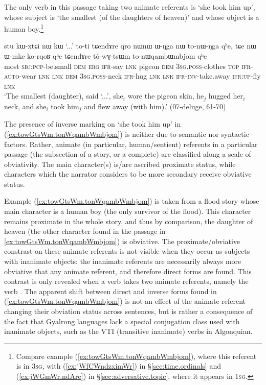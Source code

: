 The only verb in this passage taking two animate referents is  `she took him up', whose subject is  `the smallest (of the daughters of heaven)' and whose object is a human boy.\footnote{Compare example (\ref{ex:towGtsWm.tonWqambWmbjom}), where this referent is in \textsc{3sg}, with (\ref{ex:jWfCWndzximWr}) in §\ref{sec:time.ordinals} and (\ref{ex:jWGmWr.ndAre}) in §\ref{sec:adversative.topic}, where it appears in \textsc{1sg}. }

 \begin{exe}
\ex \label{ex:towGtsWm.tonWqambWmbjom} 
\gll stu kɯ-xtɕi nɯ kɯ `...' to-ti tɕendɤre qro nɯnɯ ɯ-ŋga nɯ to-nɯ-ŋga qʰe, tɕe nɯ ɯ-mke ko-rqoʁ qʰe tɕendɤre tó-wɣ-tsɯm to-nɯqambɯmbjom qʰe \\
most \textsc{sbj}:\textsc{pcp}-be.small \textsc{dem} \textsc{erg} { } \textsc{ifr}-say \textsc{lnk} pigeon \textsc{dem} \textsc{3sg}.\textsc{poss}-clothes \textsc{top} \textsc{ifr}-\textsc{auto}-wear \textsc{lnk} \textsc{lnk} \textsc{dem} \textsc{3sg}.\textsc{poss}-neck \textsc{ifr}-hug \textsc{lnk} \textsc{lnk} \textsc{ifr}-\textsc{inv}-take.away \textsc{ifr}:\textsc{up}-fly \textsc{lnk} \\
\glt `The smallest (daughter)$_i$ said `...', she$_i$ wore the pigeon skin, he$_j$ hugged her$_i$ neck, and she$_i$ took him$_j$ and flew away (with him).' (07-deluge, 61-70)
\end{exe}

The presence of inverse marking on  `she took him up' in (\ref{ex:towGtsWm.tonWqambWmbjom}) is neither due to semantic nor syntactic factors. Rather, animate (in particular, human/sentient) referents in a particular passage (the subsection of a story, or a complete) are classified along a scale of obviativity. The main character(s) is/are ascribed proximate status, while characters which the narrator considers to be more secondary receive obviative status. 

Example (\ref{ex:towGtsWm.tonWqambWmbjom}) is taken from a flood story whose main character is a human boy (the only survivor of the flood). This character remains proximate in the whole story, and thus by comparison, the daughter of heaven (the other character found in the passage in \ref{ex:towGtsWm.tonWqambWmbjom}) is obviative. The proximate/obviative constrast on these animate referents is not visible when they occur as subjects with inanimate objects: the inanimate referents are necessarily always more obviative that any animate referent, and therefore direct forms are found. This contrast is only revealed when a verb takes two animate referents, namely the verb . The apparent shift between direct and inverse forms found in (\ref{ex:towGtsWm.tonWqambWmbjom}) is not an effect of the animate referent changing their obviation status across sentences, but is rather a consequence of the fact that Gyalrong languages lack a special conjugation class used with inanimate objects, such as the VTI (transitive inanimate) verbs in Algonquian.

